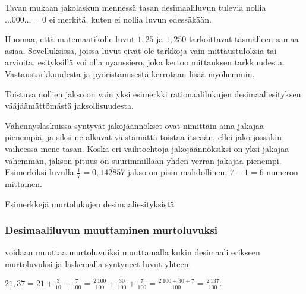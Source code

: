 Tavan mukaan jakolaskun mennessä tasan desimaaliluvun tulevia nollia $\ldots000\ldots=\overline{0}$ ei merkitä, kuten ei nollia luvun edessäkään.

\begin{esimerkki}
\end{esimerkki}

Huomaa, että matemaatikolle luvut $1,25$ ja $1,250$ tarkoittavat täsmälleen samaa asiaa. Sovelluksissa, joissa luvut eivät ole tarkkoja vain mittaustuloksia tai arvioita, esityksillä voi olla nyanssiero, joka kertoo mittauksen tarkkuudesta. Vastaustarkkuudesta ja pyöristämisestä kerrotaan lisää myöhemmin. %

Toistuva nollien jakso on vain yksi esimerkki rationaalilukujen desimaaliesityksen vääjäämättömästä jaksollisuudesta.


Vähennyslaskuissa syntyvät jakojäännökset ovat nimittäin aina jakajaa pienempiä, ja siksi ne alkavat väistämättä toistaa itseään, ellei jako jossakin vaiheessa mene tasan. Koska eri vaihtoehtoja jakojäännöksiksi on yksi jakajaa vähemmän, jakson pituus on suurimmillaan yhden verran jakajaa pienempi. Esimerkiksi luvulla $\frac{1}{7}=0,\overline{142857}$ jakso on pisin mahdollinen, $7-1=6$ numeron mittainen.

\begin{esimerkki}
Esimerkkejä murtolukujen desimaaliesityksistä
\end{esimerkki}


\subsubsection*{Desimaaliluvun muuttaminen murtoluvuksi}

 voidaan muuttaa murtoluvuiksi muuttamalla kukin
desimaali erikseen murtoluvuksi ja laskemalla syntyneet luvut yhteen.

\begin{esimerkki}
$21,37 = 21+ \frac{3}{10}+\frac{7}{100} =
\frac{2\,100}{100}+\frac{30}{100}+\frac{7}{100}
 = \frac{2\,100+30+7}{100} = \frac{2\,137}{100}.$
\end{esimerkki}

